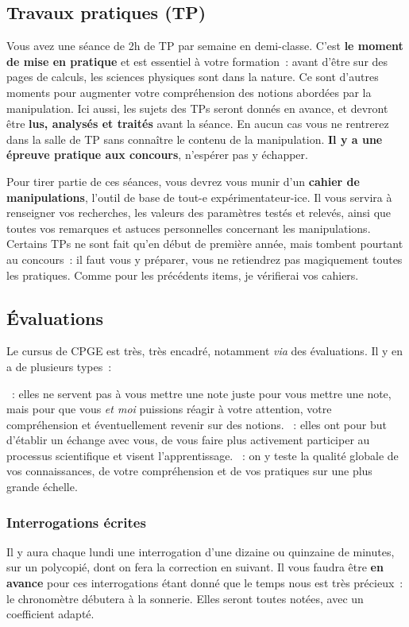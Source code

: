\documentclass[10pt, garamond]{book}
\begin{document}
\subsection{Travaux pratiques (TP)}
Vous avez une séance de 2h de TP par semaine en demi-classe. C'est \textbf{le
	moment de mise en pratique} et est essentiel à votre formation~: avant d'être
sur des pages de calculs, les sciences physiques sont dans la nature. Ce sont
d'autres moments pour augmenter votre compréhension des notions abordées par la
manipulation. Ici aussi, les sujets des TPs seront donnés en avance, et devront
être \textbf{lus, analysés et traités} avant la séance. En aucun cas vous ne
rentrerez dans la salle de TP sans connaître le contenu de la manipulation.
\textbf{Il y a une épreuve pratique aux concours}, n'espérer pas y échapper.

Pour tirer partie de ces séances, vous devrez vous munir d'un \textbf{cahier de
	manipulations}, l'outil de base de tout-e expérimentateur-ice. Il vous servira à
renseigner vos recherches, les valeurs des paramètres testés et relevés, ainsi
que toutes vos remarques et astuces personnelles concernant les manipulations.
Certains TPs ne sont fait qu'en début de première année, mais tombent pourtant
au concours~: il faut vous y préparer, vous ne retiendrez pas magiquement toutes
les pratiques. Comme pour les précédents items, je vérifierai vos cahiers.

\subsection{Évaluations}
Le cursus de CPGE est très, très encadré, notamment \textit{via} des
évaluations. Il y en a de plusieurs types~:
\begin{itemize}[label=$\diamond$, leftmargin=10pt]
	~: elles ne servent pas à vous mettre une note juste pour
	vous mettre une note, mais pour que vous \textit{et moi} puissions réagir à
	votre attention, votre compréhension et éventuellement revenir sur des
	notions.
	~: elles ont pour but d'établir un échange avec vous, de vous
	faire plus activement participer au processus scientifique et visent
	l'apprentissage.
	~: on y teste la qualité globale de vos connaissances, de
	votre compréhension et de vos pratiques sur une plus grande échelle.
\end{itemize}

\subsubsection{Interrogations écrites}
Il y aura chaque lundi une interrogation d'une dizaine ou quinzaine de minutes,
sur un polycopié, dont on fera la correction en suivant. Il vous faudra être
\textbf{en avance} pour ces interrogations étant donné que le temps nous est
très précieux~: le chronomètre débutera à la sonnerie. Elles seront toutes
notées, avec un coefficient adapté.
\end{document}
